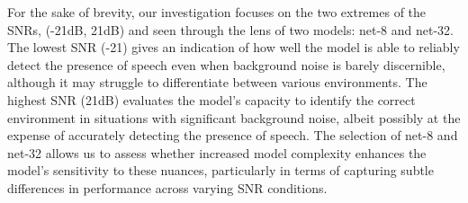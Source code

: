 \documentclass[logo,bsc,singlespacing,parskip,online]{infthesis}
\begin{document}
For the sake of brevity, our investigation focuses on the two extremes of the SNRs,
(-21dB, 21dB) and seen through the lens of two models: net-8 and net-32.
The lowest SNR (-21) gives an indication of
how well the model is able to reliably detect the presence of speech 
even when background noise is barely discernible, although it 
may struggle to differentiate between various environments.
The highest SNR (21dB) evaluates the model's
capacity to identify the correct environment in situations with significant background noise, albeit possibly at the expense of accurately detecting the presence of speech.
The selection of net-8 and net-32 allows us to assess whether increased model complexity enhances the model's sensitivity to these nuances, particularly in terms of capturing subtle differences in performance across varying SNR conditions.
\end{document}
